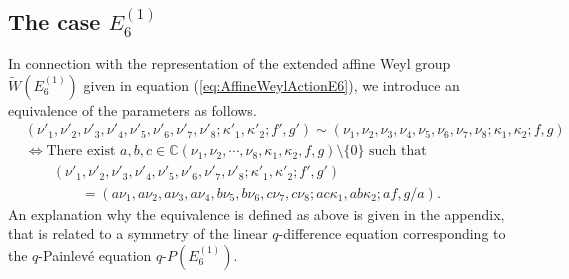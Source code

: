 \documentclass[12pt]{amsart}
\newcommand{\C}{\mathbb {C}}     %
\numberwithin{equation}{section}
\theoremstyle{definition}
\begin{document}
\subsection{The case $E^{(1)}_6 $} \label{sec:E16}

In connection with the representation of the extended affine Weyl group $\widetilde{W}(E^{(1)}_{6})$ given in equation (\ref{eq:AffineWeylActionE6}), we introduce an equivalence of the parameters as follows.
\begin{align}
&  (\nu '_1 , \nu '_2 , \nu '_3 , \nu '_4 ,\nu '_5 ,\nu '_6 , \nu '_7 ,\nu '_8 ; \kappa '_1 ,\kappa '_2 ; f' ,g' ) \sim  (\nu_1 , \nu_2 , \nu_3 , \nu_4 ,\nu_5 ,\nu_6 , \nu_7 ,\nu_8 ;\kappa_1 ,\kappa_2 ; f ,g ) \label{eq:equivE6} \\
& \Leftrightarrow \mbox{There exist } a, b, c \in \C (\nu_1 , \nu_2 , \cdots ,\nu_8 ,\kappa_1 ,\kappa_2 , f ,g ) \setminus \{ 0 \} \mbox{ such that }  \nonumber \\
& \qquad (\nu '_1 , \nu '_2 , \nu '_3 , \nu '_4 ,\nu '_5 ,\nu '_6 , \nu '_7 ,\nu '_8 ; \kappa '_1 ,\kappa '_2 ; f' ,g' )  \nonumber \\
& \qquad \qquad = (a \nu_1 , a \nu_2 , a \nu_3 , a \nu_4 ,b \nu_5 , b \nu_6 , c \nu_7 , c \nu_8 ; ac \kappa_1 , ab \kappa_2 ; af ,g/a) .  \nonumber
\end{align}
An explanation why the equivalence is defined as above is given in the appendix, that is related to a symmetry of the linear $q$-difference equation corresponding to the $q$-Painlev\'e equation $q$-$P(E^{(1)}_6)$.
\end{document}
